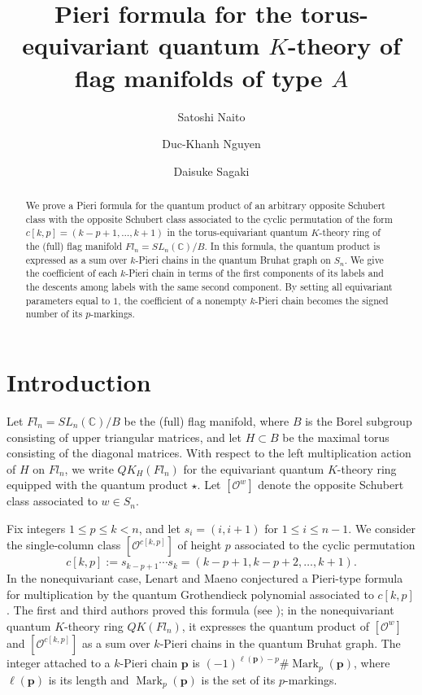 \documentclass[11pt,a4paper,reqno]{amsart}
\title[Equivariant quantum $K$-Pieri formula]{Pieri formula for the torus-equivariant quantum \(K\)-theory of flag manifolds of type \(A\)}
\author[\rev{S. Naito}]{Satoshi Naito}
\author[\rev{Duc-Khanh Nguyen}]{Duc-Khanh Nguyen}
\author[\rev{D. Sagaki}]{Daisuke Sagaki}
\date{}
\DeclareRobustCommand{\rev}[1]{{\color{revision}#1}}
\numberwithin{equation}{section}
\theoremstyle{definition}
\DeclareMathOperator{\Mark}{Mark}
\newcommand{\C}{\mathbb C}
\newcommand{\OO}{\mathcal O}
\newcommand{\Sc}[1]{[\OO^{#1}]}
\newcommand{\pp}{\mathbf p}
\begin{document}
\begin{abstract}
\rev{We prove a Pieri formula for the quantum product of an arbitrary opposite Schubert class with the opposite Schubert class associated to the cyclic permutation of the form \(c[k,p]=(k-p+1,\ldots,k+1)\) in the torus-equivariant quantum \(K\)-theory ring of the (full) flag manifold \(Fl_n = SL_n(\C)/B\). In this formula, the quantum product is expressed as a sum over \(k\)-Pieri chains in the quantum Bruhat graph on \(S_n\). We give the coefficient of each \(k\)-Pieri chain in terms of the first components of its labels and the descents among labels with the same second component. By setting all equivariant parameters equal to \(1\), the coefficient of a nonempty \(k\)-Pieri chain becomes the signed number of its \(p\)-markings.}
\end{abstract}
\maketitle

\section{Introduction}\label{sec:intro}
\rev{Let \(Fl_n=SL_n(\C)/B\) be the (full) flag manifold, where \(B\) is the Borel subgroup consisting of upper triangular matrices, and let \(H\subset B\) be the maximal torus consisting of the diagonal matrices. With respect to the left multiplication action of \(H\) on \(Fl_n\), we write \(QK_H(Fl_n)\) for the equivariant quantum \(K\)-theory ring equipped with the quantum product \(\star\). Let \(\Sc{w}\) denote the opposite Schubert class associated to \(w\in S_n\).}

\rev{Fix integers \(1\le p\le k<n\), and let \(s_i=(i,i+1)\) for \(1 \le i \le n-1\). We consider the single-column class \(\Sc{c[k,p]}\) of height \(p\) associated to the cyclic permutation}
\[
  c[k,p] :=s_{k-p+1}\cdots s_k=(k-p+1,k-p+2,\ldots,k+1).
\]
\rev{In the nonequivariant case, Lenart and Maeno \cite{LeM} conjectured a Pieri-type formula for multiplication by the quantum Grothendieck polynomial associated to \(c[k,p]\). The first and third authors proved this formula (see \cite[Theorem~2.13]{NS}); in the nonequivariant quantum \(K\)-theory ring \(QK(Fl_n)\), it expresses the quantum product of \(\Sc{w}\) and \(\Sc{c[k,p]}\) as a sum over \(k\)-Pieri chains in the quantum Bruhat graph. The integer attached to a \(k\)-Pieri chain \(\pp\) is \((-1)^{\ell(\pp)-p}\#\Mark_p(\pp)\), where \(\ell(\pp)\) is its length and \(\Mark_p(\pp)\) is the set of its \(p\)-markings.}
\end{document}

